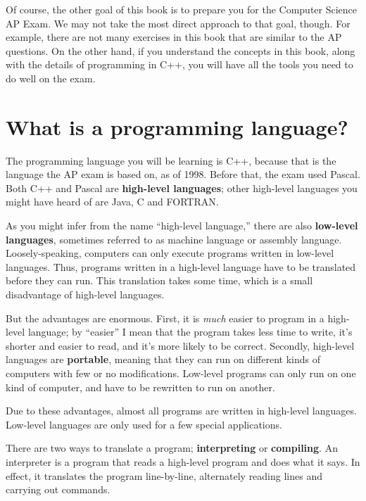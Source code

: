 Of course, the other goal of this book is to prepare you for the
Computer Science AP Exam.  We may not take the most direct approach
to that goal, though.  For example, there are not many exercises in
this book that are similar to the AP questions.  On the other hand,
if you understand the concepts in this book, along with the details
of programming in C++, you will have all the tools you need to
do well on the exam.

\section{What is a programming language?}

The programming language you will be learning is C++, because that is
the language the AP exam is based on, as of 1998.  Before that, the
exam used Pascal.  Both C++ and Pascal are {\bf high-level languages};
other high-level languages you might have heard of are Java, C and
FORTRAN.

As you might infer from the name ``high-level language,'' there are
also {\bf low-level languages}, sometimes referred to as machine
language or assembly language.  Loosely-speaking, computers can only
execute programs written in low-level languages.  Thus, programs
written in a high-level language have to be translated before they can
run.  This translation takes some time, which is a small disadvantage
of high-level languages.


But the advantages are enormous.  First,
it is {\em much} easier to program in a high-level language;
by ``easier'' I mean that the program takes less time to write,
it's shorter and easier to read, and it's more likely to be
correct.  Secondly, high-level languages are {\bf portable},
meaning that they can run on different kinds of computers with
few or no modifications.  Low-level programs can only run
on one kind of computer, and have to be rewritten to run on
another.

Due to these advantages, almost all programs are written in
high-level languages.  Low-level languages are only used for
a few special applications.


There are two ways to translate a program; {\bf interpreting} or {\bf
compiling}.  An interpreter is a program that reads a high-level
program and does what it says.  In effect, it translates the program
line-by-line, alternately reading lines and carrying out commands.

